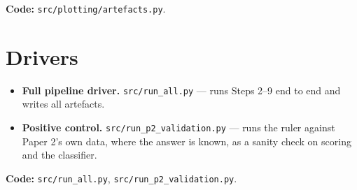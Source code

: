 \documentclass[11pt]{article}
\newcommand{\code}[1]{\texttt{\small #1}}
\begin{document}
\medskip
\noindent\textbf{Code:} \code{src/plotting/artefacts.py}.

\section{Drivers}

\begin{itemize}[leftmargin=1.4em]
  \item \textbf{Full pipeline driver.} \code{src/run\_all.py} --- runs Steps 2--9 end to end and
        writes all artefacts.
  \item \textbf{Positive control.} \code{src/run\_p2\_validation.py} --- runs the ruler against
        Paper 2's own data, where the answer is known, as a sanity check on scoring and the
        classifier.
\end{itemize}

\medskip
\noindent\textbf{Code:} \code{src/run\_all.py}, \code{src/run\_p2\_validation.py}.
\end{document}
